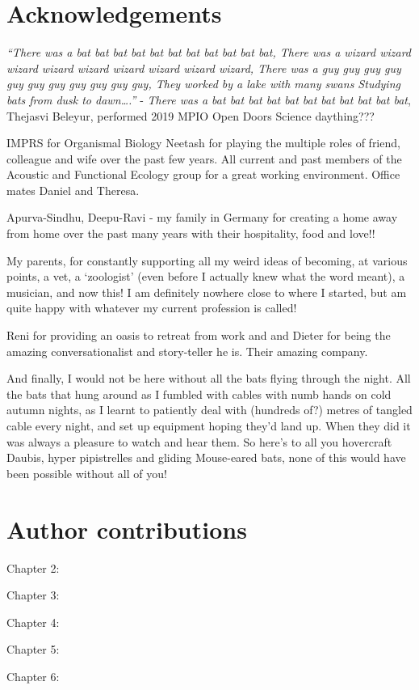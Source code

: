 \documentclass[
]{book}
\begin{document}
\hypertarget{acknowledgements}{%
\chapter{Acknowledgements}\label{acknowledgements}}

\emph{``There was a bat bat bat bat bat bat bat bat bat bat bat,
\newline
There was a wizard wizard wizard wizard wizard wizard wizard wizard wizard,
\newline 
There was a guy guy guy guy guy guy guy guy guy guy guy,
\newline
They worked by a lake with many swans
\newline
Studying bats from dusk to dawn\ldots.''}
- \emph{There was a bat bat bat bat bat bat bat bat bat bat bat}, Thejasvi Beleyur, performed 2019 MPIO Open Doors Science daything???

IMPRS for Organismal Biology
Neetash for playing the multiple roles of friend, colleague and wife over the past few years.
All current and past members of the Acoustic and Functional Ecology group for a great working environment. Office mates Daniel and Theresa.

Apurva-Sindhu, Deepu-Ravi - my family in Germany for creating a home away from home over the past many years with their hospitality, food and love!!

My parents, for constantly supporting all my weird ideas of becoming, at various points, a vet, a `zoologist' (even before I actually knew what the word meant), a musician, and now this! I am definitely nowhere close to where I started, but am quite happy with whatever my current profession is called!

Reni for providing an oasis to retreat from work and and Dieter for being the amazing conversationalist and story-teller he is. Their amazing company.

And finally, I would not be here without all the bats flying through the night. All the bats that hung around as I fumbled with cables with numb hands on cold autumn nights, as I learnt to patiently deal with (hundreds of?) metres of tangled cable every night, and set up equipment hoping they'd land up. When they did it was always a pleasure to watch and hear them. So here's to all you hovercraft Daubis, hyper pipistrelles and gliding Mouse-eared bats, none of this would have been possible without all of you!

\hypertarget{author-contributions}{%
\chapter{Author contributions}\label{author-contributions}}

Chapter 2:

Chapter 3:

Chapter 4:

Chapter 5:

Chapter 6:

  
\end{document}
